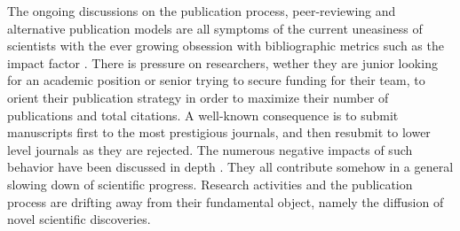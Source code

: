 \documentclass[letterpaper,twocolumn,superscriptaddress,showkeys,longbibliography]{revtex4-1}
\begin{document}
The ongoing discussions on the publication process, peer-reviewing and
alternative publication models are all symptoms of the current uneasiness of
scientists with the ever growing obsession with bibliographic metrics such as
the impact factor \cite{Fisher2012}. There is pressure on researchers, wether
they are junior looking for an academic position or senior trying to secure
funding for their team, to orient their publication strategy in order to
maximize their number of publications and total citations. A well-known
consequence is to submit manuscripts first to the most prestigious journals, and
then resubmit to lower level journals as they are rejected. The numerous
negative impacts of such behavior have been discussed in depth \cite{hoc09}.
They all contribute somehow in a general slowing down of scientific progress.
Research activities and the publication process are drifting away from their
fundamental object, namely the diffusion of novel scientific discoveries. 
\end{document}
